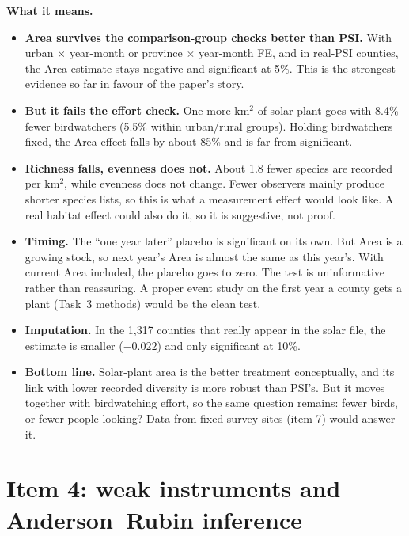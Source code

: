 \documentclass[11pt]{article}
\begin{document}
\textbf{What it means.}
\begin{itemize}[leftmargin=14pt,itemsep=1pt]
\item \textbf{Area survives the comparison-group checks better than PSI.} With urban $\times$ year-month or province $\times$ year-month FE, and in real-PSI counties, the Area estimate stays negative and significant at 5\%. This is the strongest evidence so far in favour of the paper's story.
\item \textbf{But it fails the effort check.} One more km$^2$ of solar plant goes with 8.4\% fewer birdwatchers (5.5\% within urban/rural groups). Holding birdwatchers fixed, the Area effect falls by about 85\% and is far from significant.
\item \textbf{Richness falls, evenness does not.} About 1.8 fewer species are recorded per km$^2$, while evenness does not change. Fewer observers mainly produce shorter species lists, so this is what a measurement effect would look like. A real habitat effect could also do it, so it is suggestive, not proof.
\item \textbf{Timing.} The ``one year later'' placebo is significant on its own. But Area is a growing stock, so next year's Area is almost the same as this year's. With current Area included, the placebo goes to zero. The test is uninformative rather than reassuring. A proper event study on the first year a county gets a plant (Task~3 methods) would be the clean test.
\item \textbf{Imputation.} In the 1,317 counties that really appear in the solar file, the estimate is smaller ($-0.022$) and only significant at 10\%.
\item \textbf{Bottom line.} Solar-plant area is the better treatment conceptually, and its link with lower recorded diversity is more robust than PSI's. But it moves together with birdwatching effort, so the same question remains: fewer birds, or fewer people looking? Data from fixed survey sites (item 7) would answer it.
\end{itemize}

\section{Item 4: weak instruments and Anderson--Rubin inference}
\end{document}
